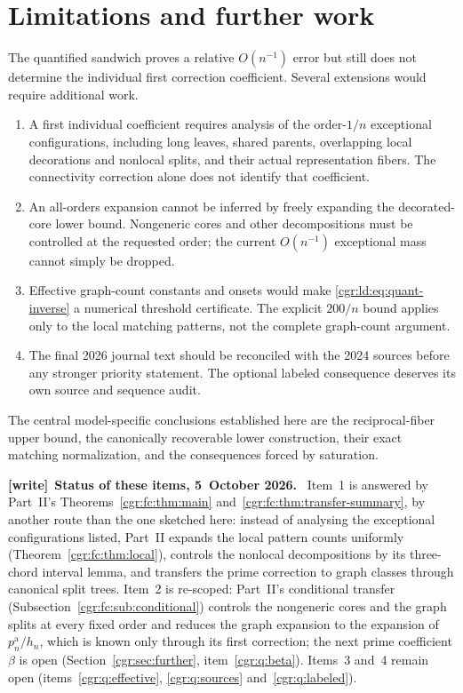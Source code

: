 \documentclass[11pt,letterpaper]{article}
\numberwithin{equation}{section}
\theoremstyle{definition}\newtheorem{definition}[theorem]{Definition}
\theoremstyle{remark}\newtheorem{remark}[theorem]{Remark}
\newenvironment{writenote}[1][]{\par\smallskip\begingroup\small
 \noindent\textbf{[write]}\if\relax\detokenize{#1}\relax\else~\textbf{#1.}\fi\ }%
 {\par\endgroup\smallskip}
\begin{document}
\section{Limitations and further work}\label{cgr:ld:sec:limits}
The quantified sandwich proves a relative $O(n^{-1})$ error but
still does not determine the individual first correction coefficient.
Several extensions would require additional work.
\begin{enumerate}
\item A first individual coefficient requires analysis of the
order-$1/n$ exceptional configurations, including long leaves,
shared parents, overlapping local decorations and nonlocal splits,
and their actual representation fibers. The connectivity correction
alone does not identify that coefficient.
\item An all-orders expansion cannot be inferred by freely
expanding the decorated-core lower bound. Nongeneric cores and
other decompositions must be controlled at the requested order;
the current $O(n^{-1})$ exceptional mass cannot simply be dropped.
\item Effective graph-count constants and onsets would make
\eqref{cgr:ld:eq:quant-inverse} a numerical threshold certificate.
The explicit $200/n$ bound applies only to the local matching
patterns, not the complete graph-count argument.
\item The final 2026 journal text should be reconciled with the
2024 sources before any stronger priority statement. The optional
labeled consequence deserves its own source and sequence audit.
\end{enumerate}
The central model-specific conclusions established here are the
reciprocal-fiber upper bound, the canonically recoverable lower
construction, their exact matching normalization, and the
consequences forced by saturation.
\begin{writenote}[Status of these items, 5~October 2026]
Item~1 is answered by Part~II's Theorems~\ref{cgr:fc:thm:main} and~\ref{cgr:fc:thm:transfer-summary}, by another route than the one sketched here: instead of analysing the exceptional configurations listed, Part~II expands the local pattern counts uniformly (Theorem~\ref{cgr:fc:thm:local}), controls the nonlocal decompositions by its three-chord interval lemma, and transfers the prime correction to graph classes through canonical split trees. Item~2 is re-scoped: Part~II's conditional transfer (Subsection~\ref{cgr:fc:sub:conditional}) controls the nongeneric cores and the graph splits at every fixed order and reduces the graph expansion to the expansion of $p_n^{\mathrm a}/h_n$, which is known only through its first correction; the next prime coefficient $\beta$ is open (Section~\ref{cgr:sec:further}, item~\ref{cgr:q:beta}). Items~3 and~4 remain open (items~\ref{cgr:q:effective}, \ref{cgr:q:sources} and~\ref{cgr:q:labeled}).
\end{writenote}
\end{document}
